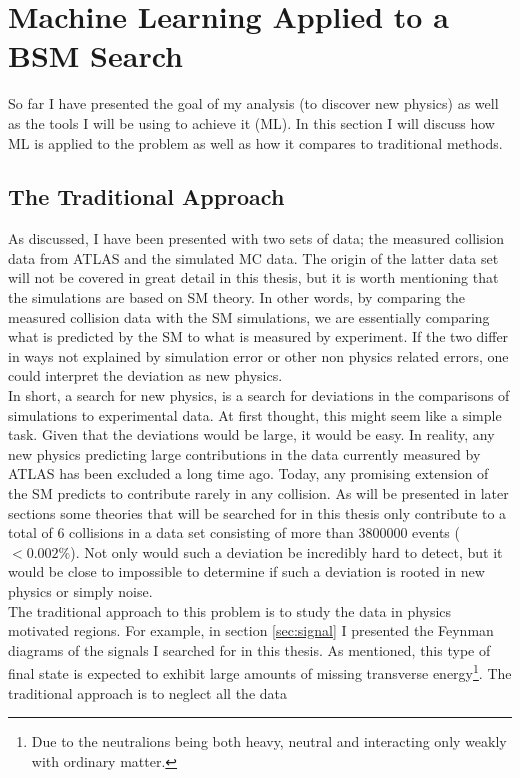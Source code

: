 \section{Machine Learning Applied to a BSM Search}\label{sec:MLHEP}
So far I have presented the goal of my analysis (to discover new physics)
as well as the tools I will be using to achieve it (\ac{ML}). In this section
I will discuss how \ac{ML} is applied to the problem as well as how it compares
to traditional methods.
\subsection{The Traditional Approach}
As discussed, I have been presented with two sets of data; the measured collision 
data from \ac{ATLAS} and the simulated \ac{MC} data. The origin of the latter data set 
will not be covered in great detail in this thesis, but it is worth mentioning that 
the simulations are based on \ac{SM} theory. In other words, by comparing the measured collision 
data with the \ac{SM} simulations, we are essentially comparing what is predicted by the \ac{SM} 
to what is measured by experiment. If the two differ in ways not explained by simulation error 
or other non physics related errors, one could interpret the deviation as new physics.
\\
In short, a search for new physics, is a search for deviations in the comparisons of simulations 
to experimental data. At first thought, this might seem like a simple task. Given that the deviations 
would be large, it would be easy. In reality, any new physics predicting large contributions 
in the data currently measured by \ac{ATLAS} has been excluded a long time ago. Today, any
promising extension of the \ac{SM} predicts to contribute rarely in any collision. As will 
be presented in later sections some theories that will be searched for in this thesis only 
contribute to a total of 6 collisions in a data set consisting of more than $3800000$ events 
($<0.002\%$). Not only would such a deviation be incredibly hard to detect, but it would 
be close to impossible to determine if such a deviation is rooted in new physics or simply 
noise. 
\\
The traditional approach to this problem is to study the data in physics motivated regions. 
For example, in section \ref{sec:signal} I presented the Feynman diagrams of the signals I 
searched for in this thesis. As mentioned, this type of final state is expected to exhibit 
large amounts of missing transverse energy\footnote{Due to the neutralions being both heavy, neutral 
and interacting only weakly with ordinary matter.}. The traditional approach is to neglect all the data 
